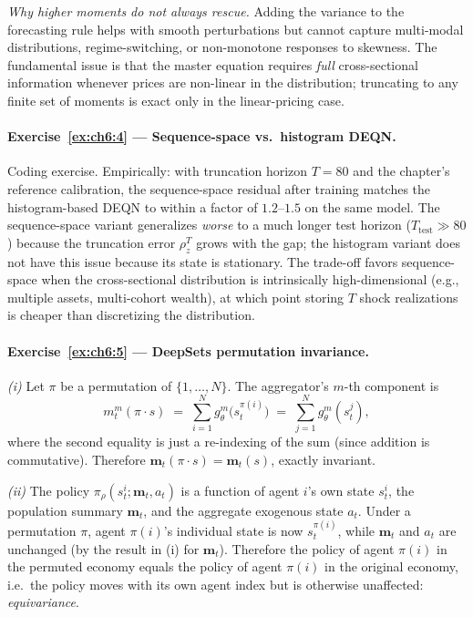 \documentclass[11pt,a4paper]{report}
\begin{document}
\emph{Why higher moments do not always rescue.}  Adding the variance to the forecasting rule helps with smooth perturbations but cannot capture multi-modal distributions, regime-switching, or non-monotone responses to skewness.  The fundamental issue is that the master equation requires \emph{full} cross-sectional information whenever prices are non-linear in the distribution; truncating to any finite set of moments is exact only in the linear-pricing case.

\paragraph{Exercise~\ref{ex:ch6:4} --- Sequence-space vs.\ histogram DEQN.}
Coding exercise.  Empirically: with truncation horizon $T = 80$ and the chapter's reference calibration, the sequence-space residual after training matches the histogram-based DEQN to within a factor of $1.2$--$1.5$ on the same model.  The sequence-space variant generalizes \emph{worse} to a much longer test horizon ($T_\mathrm{test} \gg 80$) because the truncation error $\rho_z^T$ grows with the gap; the histogram variant does not have this issue because its state is stationary.  The trade-off favors sequence-space when the cross-sectional distribution is intrinsically high-dimensional (e.g., multiple assets, multi-cohort wealth), at which point storing $T$ shock realizations is cheaper than discretizing the distribution.

\paragraph{Exercise~\ref{ex:ch6:5} --- DeepSets permutation invariance.}
\emph{(i)} Let $\pi$ be a permutation of $\{1, \dots, N\}$.  The aggregator's $m$-th component is
\[
   m_t^m(\pi \cdot s) \;=\; \sum_{i=1}^N g_\theta^m\bigl(s_t^{\pi(i)}\bigr) \;=\; \sum_{j=1}^N g_\theta^m(s_t^j),
\]
where the second equality is just a re-indexing of the sum (since addition is commutative).  Therefore $\bm m_t(\pi \cdot s) = \bm m_t(s)$, exactly invariant.

\emph{(ii)} The policy $\pi_\rho(s_t^i; \bm m_t, a_t)$ is a function of agent $i$'s own state $s_t^i$, the population summary $\bm m_t$, and the aggregate exogenous state $a_t$.  Under a permutation $\pi$, agent $\pi(i)$'s individual state is now $s_t^{\pi(i)}$, while $\bm m_t$ and $a_t$ are unchanged (by the result in (i) for $\bm m_t$).  Therefore the policy of agent $\pi(i)$ in the permuted economy equals the policy of agent $\pi(i)$ in the original economy, i.e.\ the policy moves with its own agent index but is otherwise unaffected: \emph{equivariance}.
\end{document}
